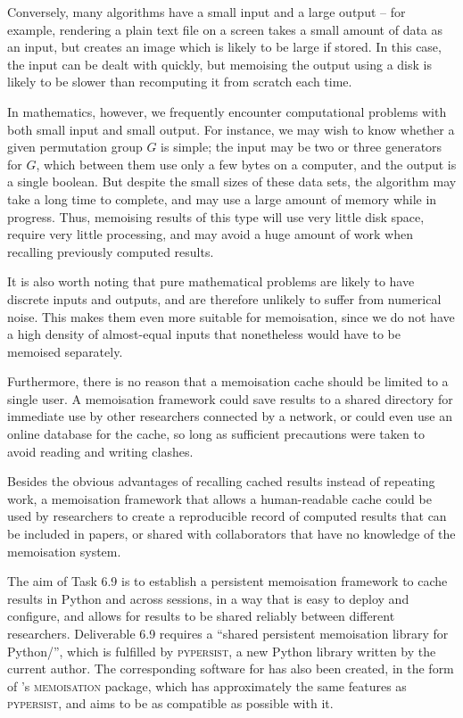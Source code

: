 \documentclass{deliverablereport}
\newcommand{\pypersist}{\textsc{pypersist}}
\newcommand{\Memoisation}{\textsc{memoisation}}
\begin{document}
Conversely, many algorithms have a small input and a large output -- for
example, rendering a plain text file on a screen takes a small amount of data as
an input, but creates an image which is likely to be large if stored.  In this
case, the input can be dealt with quickly, but memoising the output using a disk
is likely to be slower than recomputing it from scratch each time.

In mathematics, however, we frequently encounter computational problems with
both small input and small output.  For instance, we may wish to know whether a
given permutation group $G$ is simple; the input may be two or three generators
for $G$, which between them use only a few bytes on a computer, and the output
is a single boolean.  But despite the small sizes of these data sets, the
algorithm may take a long time to complete, and may use a large amount of memory
while in progress.  Thus, memoising results of this type will use very little
disk space, require very little processing, and may avoid a huge amount of work
when recalling previously computed results.

It is also worth noting that pure mathematical problems are likely to have
discrete inputs and outputs, and are therefore unlikely to suffer from numerical
noise.  This makes them even more suitable for memoisation, since we do not have
a high density of almost-equal inputs that nonetheless would have to be memoised
separately.

Furthermore, there is no reason that a memoisation cache should be limited to a
single user.  A memoisation framework could save results to a shared directory
for immediate use by other researchers connected by a network, or could even
use an online database for the cache, so long as sufficient precautions were
taken to avoid reading and writing clashes.

Besides the obvious advantages of recalling cached results instead of repeating
work, a memoisation framework that allows a human-readable cache could be used
by researchers to create a reproducible record of computed results that can be
included in papers, or shared with collaborators that have no knowledge of the
memoisation system.

The aim of \ODK Task 6.9 is to establish a persistent memoisation framework to
cache results in Python and \GAP across sessions, in a way that is easy to deploy
and configure, and allows for results to be shared reliably between different
researchers.  Deliverable 6.9 requires a ``shared persistent memoisation library
for Python/\Sage'', which is fulfilled by \pypersist{}, a new Python library
written by the current author.  The corresponding software for \GAP has also been
created, in the form of \GAP's \Memoisation{} package, which has
approximately the same features as \pypersist{}, and aims to be as compatible as
possible with it.
\end{document}
